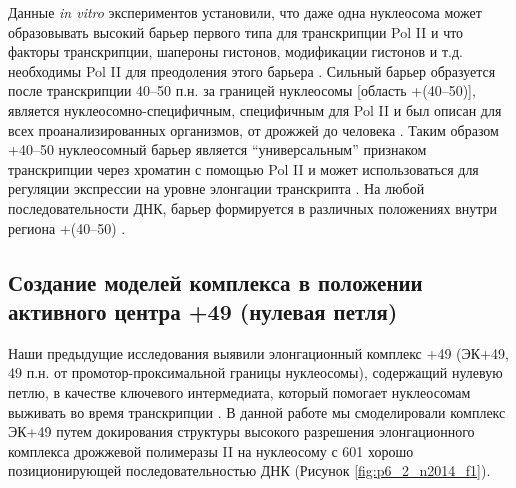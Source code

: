     Данные \textit{in vitro} экспериментов установили, что даже одна нуклеосома может образовывать высокий барьер первого типа для транскрипции Pol II \cite{brown_activator-dependent_1996,izban_transcription_1991,bondarenko_nucleosomes_2006,kireeva_nature_2005,kulaeva_mechanism_2009,hall_high_2009} и что факторы транскрипции, шапероны гистонов, модификации гистонов и т.д. необходимы Pol II  для преодоления этого барьера \cite{bondarenko_nucleosomes_2006,kireeva_nature_2005,brown_disruption_1997,izban_factor-stimulated_1992,hsieh_histone_2013,kulaeva_rna_2010,kim_human_2010,guermah_synergistic_2006,carey_rsc_2006,bintu_nucleosomal_2012,jin_synergistic_2010}. Сильный барьер образуется после транскрипции 40–50 п.н. за границей нуклеосомы [область +(40–50)], является нуклеосомно-специфичным, специфичным для Pol II и был описан для всех проанализированных организмов, от дрожжей до человека \cite{izban_transcription_1991,bondarenko_nucleosomes_2006,kireeva_nature_2005}. Таким образом +40–50 нуклеосомный барьер является ``универсальным'' признаком транскрипции через хроматин с помощью Pol II и может использоваться для регуляции экспрессии на уровне элонгации транскрипта \cite{bondarenko_nucleosomes_2006}. На любой последовательности ДНК, барьер формируется в различных положениях внутри региона +(40–50)  \cite{bondarenko_nucleosomes_2006}.

\subsection{Создание моделей комплекса в положении активного центра +49 (нулевая петля)}
    Наши предыдущие исследования выявили элонгационный комплекс +49 (ЭК+49, 49 п.н. от промотор-проксимальной границы нуклеосомы), содержащий нулевую петлю, в качестве ключевого интермедиата, который помогает нуклеосомам выживать во время транскрипции \cite{kulaeva_mechanism_2009}. В данной работе мы смоделировали комплекс ЭК+49 путем докирования структуры высокого разрешения элонгационного комплекса дрожжевой полимеразы II  на нуклеосому с 601 хорошо позиционирующей последовательностью ДНК \cite{vasudevan_crystal_2010,kettenberger_complete_2004} (Рисунок \ref{fig:p6_2_n2014_f1}).
    
